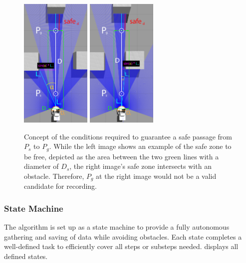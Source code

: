 \begin{figure}[H]%
\centering
\includegraphics[width=0.30\textwidth]{Bilder/Safe_passage_true_final.png} 
\hspace{1.0 cm}
\includegraphics[width=0.30\textwidth]{Bilder/Safe_passage_false_final.png} 
\caption[]{Concept of the conditions required to guarantee a safe passage from $ P_{s} $ to $ P_{g} $. While the left image shows an example of the safe zone to be free, depicted as the area between the two green lines with a diameter of $ D_{s} $, the right image's safe zone intersects with an obstacle. Therefore, $ P_{g} $ at the right image would not be a valid candidate for recording.}
\label{safe_passage}
\end{figure}

\subsubsection{State Machine \label{state_machine} }
The algorithm is set up as a state machine to provide a fully autonomous gathering and saving of data while avoiding obstacles. Each state completes a well-defined task to efficiently cover all steps or substeps needed.  displays all defined states.

